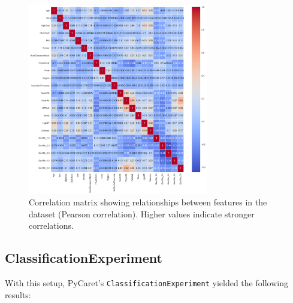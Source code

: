 \documentclass[a4paper,12pt]{article}
\begin{document}
\begin{figure}[H]
    \centering
    \includegraphics[width=0.7\textwidth]{correlation_matrix.png}
    \caption{Correlation matrix showing relationships between features in the dataset (Pearson correlation). 
    Higher values indicate stronger correlations.}
    \label{fig:correlation_matrix}
\end{figure}

\subsection{ClassificationExperiment}
With this setup, PyCaret's \texttt{ClassificationExperiment} yielded the following results:
\end{document}
